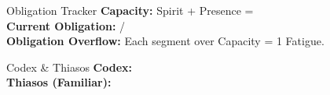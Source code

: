 \documentclass[10pt]{article}
\begin{document}
\begin{minipage}[t]{0.48\linewidth}
    \vspace{0.5em}
    
    \begin{charbox}{Obligation Tracker}
        \textbf{Capacity:} Spirit \underline{\hspace{1cm}} + Presence \underline{\hspace{1cm}} = \underline{\hspace{1.5cm}}\\
        \textbf{Current Obligation:} \underline{\hspace{1cm}} / \underline{\hspace{1.5cm}}\\
        \textbf{Obligation Overflow:} Each segment over Capacity = 1 Fatigue.
    \end{charbox}
    
    \vspace{0.5em}
    
    \begin{charbox}{Codex \& Thiasos}
        \textbf{Codex:} \underline{\hspace{6cm}}\\
        \textbf{Thiasos (Familiar):} \underline{\hspace{6cm}}
    \end{charbox}
\end{minipage}
\hfill
\end{document}
